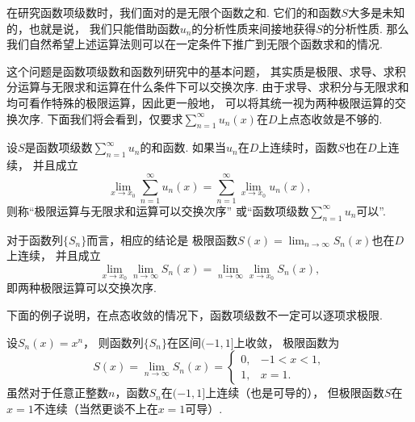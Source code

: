 在研究函数项级数时，我们面对的是无限个函数之和.
它们的和函数\(S\)大多是未知的，也就是说，
我们只能借助函数\(u_n\)的分析性质来间接地获得\(S\)的分析性质.
那么我们自然希望上述运算法则可以在一定条件下推广到无限个函数求和的情况.

这个问题是函数项级数和函数列研究中的基本问题，
其实质是极限、求导、求积分运算与无限求和运算在什么条件下可以交换次序.
由于求导、求积分与无限求和均可看作特殊的极限运算，因此更一般地，
可以将其统一视为两种极限运算的交换次序.
下面我们将会看到，仅要求\(\sum_{n=1}^\infty u_n(x)\)在\(D\)上点态收敛是不够的.

\begin{definition}
设\(S\)是函数项级数\(\sum_{n=1}^\infty u_n\)的和函数.
如果当\(u_n\)在\(D\)上连续时，函数\(S\)也在\(D\)上连续，
并且成立\begin{equation*}
	\lim_{x \to x_0} \sum_{n=1}^\infty u_n(x)
	= \sum_{n=1}^\infty \lim_{x \to x_0} u_n(x),
\end{equation*}
则称“极限运算与无限求和运算可以交换次序”
或“函数项级数\(\sum_{n=1}^\infty u_n\)可以”.
\end{definition}
对于函数列\(\{S_n\}\)而言，相应的结论是
极限函数\(S(x) = \lim_{n\to\infty} S_n(x)\)也在\(D\)上连续，
并且成立\begin{equation*}
	\lim_{x \to x_0} \lim_{n\to\infty} S_n(x)
	= \lim_{n\to\infty} \lim_{x \to x_0} S_n(x),
\end{equation*}
即两种极限运算可以交换次序.

下面的例子说明，在点态收敛的情况下，函数项级数不一定可以逐项求极限.
\begin{example}\label{example:函数项级数.点态收敛情况下和函数可能不连续}
设\(S_n(x) = x^n\)，
则函数列\(\{S_n\}\)在区间\((-1,1]\)上收敛，
极限函数为\begin{equation*}
	S(x) = \lim_{n\to\infty} S_n(x)
	= \left\{ \begin{array}{ll}
		0, & -1<x<1, \\
		1, & x=1.
	\end{array} \right.
\end{equation*}
虽然对于任意正整数\(n\)，函数\(S_n\)在\((-1,1]\)上连续（也是可导的），
但极限函数\(S\)在\(x=1\)不连续（当然更谈不上在\(x=1\)可导）.
\end{example}

